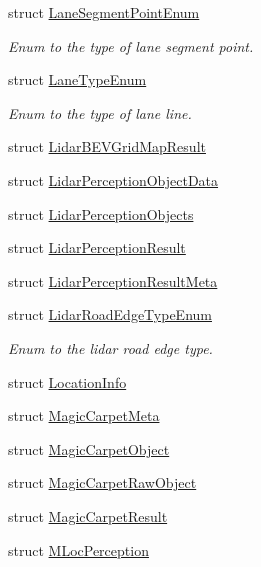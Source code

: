 \begin{DoxyCompactItemize}
struct \hyperlink{structmaf__perception__interface_1_1LaneSegmentPointEnum}{Lane\+Segment\+Point\+Enum}
\begin{DoxyCompactList}\small\item\em Enum to the type of lane segment point. \end{DoxyCompactList}\item 
struct \hyperlink{structmaf__perception__interface_1_1LaneTypeEnum}{Lane\+Type\+Enum}
\begin{DoxyCompactList}\small\item\em Enum to the type of lane line. \end{DoxyCompactList}\item 
struct \hyperlink{structmaf__perception__interface_1_1LidarBEVGridMapResult}{Lidar\+B\+E\+V\+Grid\+Map\+Result}
\item 
struct \hyperlink{structmaf__perception__interface_1_1LidarPerceptionObjectData}{Lidar\+Perception\+Object\+Data}
\item 
struct \hyperlink{structmaf__perception__interface_1_1LidarPerceptionObjects}{Lidar\+Perception\+Objects}
\item 
struct \hyperlink{structmaf__perception__interface_1_1LidarPerceptionResult}{Lidar\+Perception\+Result}
\item 
struct \hyperlink{structmaf__perception__interface_1_1LidarPerceptionResultMeta}{Lidar\+Perception\+Result\+Meta}
\item 
struct \hyperlink{structmaf__perception__interface_1_1LidarRoadEdgeTypeEnum}{Lidar\+Road\+Edge\+Type\+Enum}
\begin{DoxyCompactList}\small\item\em Enum to the lidar road edge type. \end{DoxyCompactList}\item 
struct \hyperlink{structmaf__perception__interface_1_1LocationInfo}{Location\+Info}
\item 
struct \hyperlink{structmaf__perception__interface_1_1MagicCarpetMeta}{Magic\+Carpet\+Meta}
\item 
struct \hyperlink{structmaf__perception__interface_1_1MagicCarpetObject}{Magic\+Carpet\+Object}
\item 
struct \hyperlink{structmaf__perception__interface_1_1MagicCarpetRawObject}{Magic\+Carpet\+Raw\+Object}
\item 
struct \hyperlink{structmaf__perception__interface_1_1MagicCarpetResult}{Magic\+Carpet\+Result}
\item 
struct \hyperlink{structmaf__perception__interface_1_1MLocPerception}{M\+Loc\+Perception}

\end{DoxyCompactItemize}

